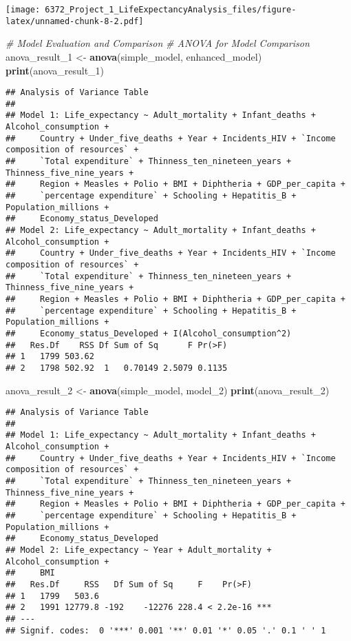 \documentclass[
]{article}
\newenvironment{Shaded}{\begin{snugshade}}{\end{snugshade}}
\newcommand{\CommentTok}[1]{\textcolor[rgb]{0.56,0.35,0.01}{\textit{#1}}}
\newcommand{\FunctionTok}[1]{\textcolor[rgb]{0.13,0.29,0.53}{\textbf{#1}}}
\newcommand{\NormalTok}[1]{#1}
\newcommand{\OtherTok}[1]{\textcolor[rgb]{0.56,0.35,0.01}{#1}}
\begin{document}
\texttt{[image: 6372\_Project\_1\_LifeExpectancyAnalysis\_files/figure-latex/unnamed-chunk-8-2.pdf]}

\begin{Shaded}
\begin{Highlighting}[]
\CommentTok{\# Model Evaluation and Comparison}
\CommentTok{\# ANOVA for Model Comparison}
\NormalTok{anova\_result\_1 }\OtherTok{\textless{}{-}} \FunctionTok{anova}\NormalTok{(simple\_model, enhanced\_model)}
\FunctionTok{print}\NormalTok{(anova\_result\_1)}
\end{Highlighting}
\end{Shaded}

\begin{verbatim}
## Analysis of Variance Table
## 
## Model 1: Life_expectancy ~ Adult_mortality + Infant_deaths + Alcohol_consumption + 
##     Country + Under_five_deaths + Year + Incidents_HIV + `Income composition of resources` + 
##     `Total expenditure` + Thinness_ten_nineteen_years + Thinness_five_nine_years + 
##     Region + Measles + Polio + BMI + Diphtheria + GDP_per_capita + 
##     `percentage expenditure` + Schooling + Hepatitis_B + Population_millions + 
##     Economy_status_Developed
## Model 2: Life_expectancy ~ Adult_mortality + Infant_deaths + Alcohol_consumption + 
##     Country + Under_five_deaths + Year + Incidents_HIV + `Income composition of resources` + 
##     `Total expenditure` + Thinness_ten_nineteen_years + Thinness_five_nine_years + 
##     Region + Measles + Polio + BMI + Diphtheria + GDP_per_capita + 
##     `percentage expenditure` + Schooling + Hepatitis_B + Population_millions + 
##     Economy_status_Developed + I(Alcohol_consumption^2)
##   Res.Df    RSS Df Sum of Sq      F Pr(>F)
## 1   1799 503.62                           
## 2   1798 502.92  1   0.70149 2.5079 0.1135
\end{verbatim}

\begin{Shaded}
\begin{Highlighting}[]
\NormalTok{anova\_result\_2 }\OtherTok{\textless{}{-}} \FunctionTok{anova}\NormalTok{(simple\_model, model\_2)}
\FunctionTok{print}\NormalTok{(anova\_result\_2)}
\end{Highlighting}
\end{Shaded}

\begin{verbatim}
## Analysis of Variance Table
## 
## Model 1: Life_expectancy ~ Adult_mortality + Infant_deaths + Alcohol_consumption + 
##     Country + Under_five_deaths + Year + Incidents_HIV + `Income composition of resources` + 
##     `Total expenditure` + Thinness_ten_nineteen_years + Thinness_five_nine_years + 
##     Region + Measles + Polio + BMI + Diphtheria + GDP_per_capita + 
##     `percentage expenditure` + Schooling + Hepatitis_B + Population_millions + 
##     Economy_status_Developed
## Model 2: Life_expectancy ~ Year + Adult_mortality + Alcohol_consumption + 
##     BMI
##   Res.Df     RSS   Df Sum of Sq     F    Pr(>F)    
## 1   1799   503.6                                   
## 2   1991 12779.8 -192    -12276 228.4 < 2.2e-16 ***
## ---
## Signif. codes:  0 '***' 0.001 '**' 0.01 '*' 0.05 '.' 0.1 ' ' 1
\end{verbatim}
\end{document}
